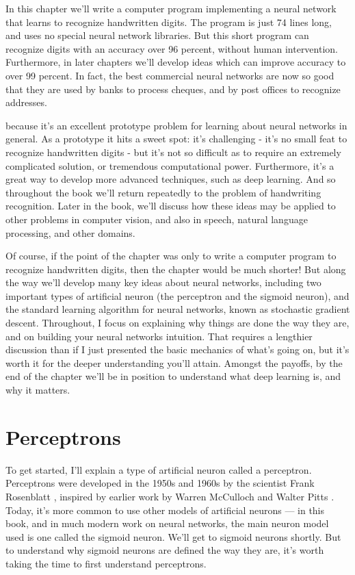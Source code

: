 In this chapter we'll write a computer program implementing a neural network that learns to recognize handwritten digits. The program is just 74 lines long, and uses no special neural network libraries. But this short program can recognize digits with an accuracy over 96 percent, without human intervention. Furthermore, in later chapters we'll develop ideas which can improve accuracy to over 99 percent. In fact, the best commercial neural networks are now so good that they are used by banks to process cheques, and by post offices to recognize addresses.

 because it's an excellent prototype problem for learning about neural networks in general. As a prototype it hits a sweet spot: it's challenging - it's no small feat to recognize handwritten digits - but it's not so difficult as to require an extremely complicated solution, or tremendous computational power. Furthermore, it's a great way to develop more advanced techniques, such as deep learning. And so throughout the book we'll return repeatedly to the problem of handwriting recognition. Later in the book, we'll discuss how these ideas may be applied to other problems in computer vision, and also in speech, natural language processing, and other domains.

Of course, if the point of the chapter was only to write a computer program to recognize handwritten digits, then the chapter would be much shorter! But along the way we'll develop many key ideas about neural networks, including two important types of artificial neuron (the perceptron and the sigmoid neuron), and the standard learning algorithm for neural networks, known as stochastic gradient descent. Throughout, I focus on explaining why things are done the way they are, and on building your neural networks intuition. That requires a lengthier discussion than if I just presented the basic mechanics of what's going on, but it's worth it for the deeper understanding you'll attain. Amongst the payoffs, by the end of the chapter we'll be in position to understand what deep learning is, and why it matters.

\section{Perceptrons}

 To get started, I'll explain a type of artificial neuron called a perceptron. Perceptrons were developed in the 1950s and 1960s by the scientist Frank Rosenblatt \cite{rosenblatt1962principles}, inspired by earlier work by Warren McCulloch and Walter Pitts \cite{McCulloch1943}. Today, it's more common to use other models of artificial neurons --- in this book, and in much modern work on neural networks, the main neuron model used is one called the sigmoid neuron. We'll get to sigmoid neurons shortly. But to understand why sigmoid neurons are defined the way they are, it's worth taking the time to first understand perceptrons.


